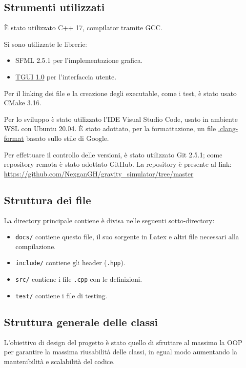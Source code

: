\documentclass{article}
\begin{document}
\subsection{Strumenti utilizzati}
È stato utilizzato C++ 17, compilator tramite GCC.

Si sono utilizzate le librerie:
\begin{itemize}
    \item SFML 2.5.1 per l'implementazione grafica.
    \item \href{https://tgui.eu/tutorials/1.0/linux/}{TGUI 1.0} per l'interfaccia utente.
\end{itemize}

Per il linking dei file e la creazione degli executable, come i test, è stato usato CMake 3.16.

Per lo sviluppo è stato utilizzato l'IDE Visual Studio Code, usato in ambiente WSL con Ubuntu 20.04. È stato adottato, per la formattazione, un file \href{https://github.com/NexganGH/gravity_simulator/blob/master/.clang-format}{.clang-format} basato sullo stile di Google.

Per effettuare il controllo delle versioni, è stato utilizzato Git 2.5.1; come repository remota è stato adottato GitHub. La repository è presente al link: \url{https://github.com/NexganGH/gravity_simulator/tree/master}


\subsection{Struttura dei file}
La directory principale contiene è divisa nelle seguenti sotto-directory:
\begin{itemize}
    \item \verb|docs/| contiene questo file, il suo sorgente in Latex e altri file necessari alla compilazione.
    \item \verb|include/| contiene gli header (\verb|.hpp|).
    \item \verb|src/| contiene i file \verb|.cpp| con le definizioni.
    \item \verb|test/| contiene i file di testing.
\end{itemize}

\subsection{Struttura generale delle classi}

L'obiettivo di design del progetto è stato quello di sfruttare al massimo la OOP per garantire la massima riusabilità delle classi, in egual modo aumentando la mantenibilità e scalabilità del codice.
\end{document}
